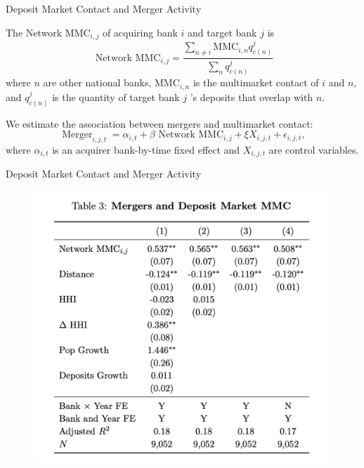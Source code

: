 \documentclass[notes,10.2pt, aspectratio=169]{beamer}
\newenvironment{wideitemize}{\itemize\addtolength{\itemsep}{10pt}}{\enditemize}
\begin{document}
\begin{frame}{Deposit Market Contact and Merger Activity}
  \vspace{0.1cm}
  \begin{wideitemize}
  \item The Network $\mathrm{MMC}_{i, j}$ of acquiring bank $i$ and target bank $j$ is
  $$
  \text { Network } \mathrm{MMC}_{i, j}=\frac{\sum_{n \neq i} \mathrm{MMC}_{i, n} q_{c(n)}^j}{\sum_n q_{c(n)}^j}
  $$
  where $n$ are other national banks,  $\mathrm{MMC}_{i, n}$ is the multimarket contact of $i$  and $n$, and $q_{c(n)}^j$ is the quantity of target bank $j$ 's deposits that overlap with $n$. 

  \item We estimate the association between mergers and multimarket contact:
  $$
  \operatorname{Merger}_{i, j, t}=\alpha_{i, t}+\beta \text { Network } \mathrm{MMC}_{i, j}+\xi X_{i, j, t}+\epsilon_{i, j, t},
  $$
  where $\alpha_{i, t}$ is an acquirer bank-by-time fixed effect and $X_{i, j, t}$ are control variables.


\end{wideitemize}
\end{frame}

\begin{frame}{Deposit Market Contact and Merger Activity}
  \vspace{0.1cm}


\begin{figure}[t*]
  \centering
  \includegraphics[width=.55\textwidth]{./imgs/table3.png}
\end{figure}


\end{frame}
\end{document}
